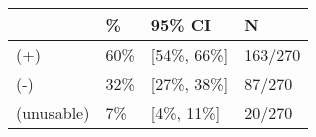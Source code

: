 \begin{tabular}{llll}
\hline
& \% & 95\% CI  & N \\
\hline
(+) & 60\% & [54\%, 66\%] & 163/270\\
(-) & 32\% & [27\%, 38\%] & 87/270\\
(unusable) & 7\% & [4\%, 11\%] & 20/270\\
\hline
\end{tabular}
